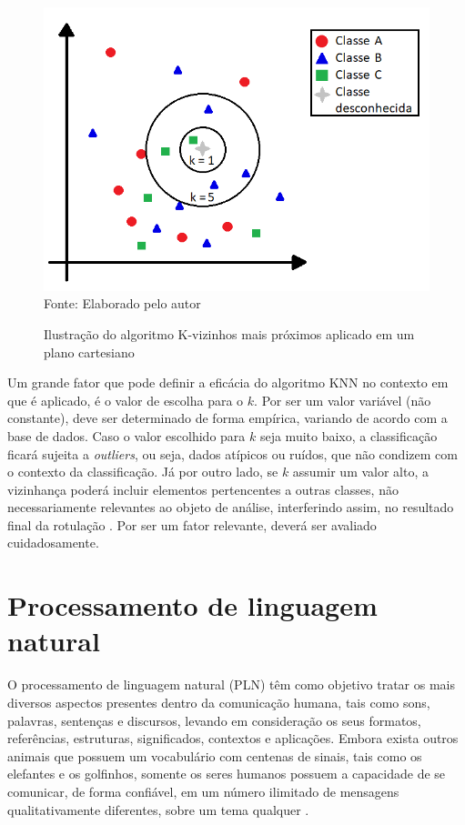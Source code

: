 \begin{figure}[ht!]
\caption{Ilustração do algoritmo K-vizinhos mais próximos aplicado em um plano cartesiano}
\label{fig:knnExample}
\centering
\includegraphics[scale=0.5]{img/knnExample.png}
{\fontsize{11pt}{\baselineskip}\selectfont
\\Fonte: Elaborado pelo autor
}
\end{figure}

Um grande fator que pode definir a eficácia do algoritmo KNN no contexto em que é aplicado, é o valor de escolha para o $k$. Por ser um valor variável (não constante), deve ser determinado de forma empírica, variando de acordo com a base de dados. Caso o valor escolhido para $k$ seja muito baixo, a classificação ficará sujeita a \textit{outliers}, ou seja, dados atípicos ou ruídos, que não condizem com o contexto da classificação. Já por outro lado, se $k$ assumir um valor alto, a vizinhança poderá incluir elementos pertencentes a outras classes, não necessariamente relevantes ao objeto de análise, interferindo assim, no resultado final da rotulação \citep{fukunaga1975knn}. Por ser um fator relevante, deverá ser avaliado cuidadosamente.

\section{Processamento de linguagem natural}
O processamento de linguagem natural (PLN) têm como objetivo tratar os mais diversos aspectos presentes dentro da comunicação humana, tais como sons, palavras, sentenças e discursos, levando em consideração os seus formatos, referências, estruturas, significados, contextos e aplicações. Embora exista outros animais que possuem um vocabulário com centenas de sinais, tais como os elefantes e os golfinhos, somente os seres humanos possuem a capacidade de se comunicar, de forma confiável, em um número ilimitado de mensagens qualitativamente diferentes, sobre um tema qualquer \citep{russell1994inteligencia, gonzalez2003recuperaccao}.

